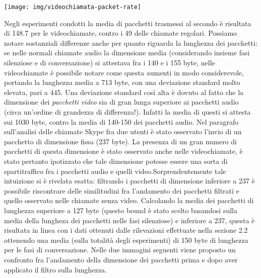 \begin{center}

\begin{minipage}{\linewidth}
\texttt{[image: img/videochiamata-packet-rate]}
\end{minipage}
\end{center}

Negli esperimenti condotti la media di pacchetti trasmessi al secondo è risultata di 148.7 per le videochiamate, contro i 49 delle chiamate regolari.\newline
Possiamo notare sostanziali differenze anche per quanto riguarda la lunghezza dei pacchetti: se nelle normali chiamate audio la dimensione media (considerando insieme fasi silenziose e di conversazione) si attestava fra i 140 e i 155 byte, nelle videochiamate è possibile notare come questa aumenti in modo considerevole, portando la lunghezza media a 713 byte, con una deviazione standard molto elevata, pari a 445.\newline
Una deviazione standard così alta è dovuto al fatto che la dimensione dei \emph{pacchetti video} sia di gran lunga superiore ai pacchetti audio (circa un'ordine di grandezza di differenza!). Infatti la media di questi si attesta sui 1030 byte, contro la media di 140-150 dei pacchetti audio.\newline\newline
Nel paragrafo sull'analisi delle chiamate Skype fra due utenti è stato osservato l'invio di un pacchetto di dimensione fissa (237 byte). La presenza di un gran numero di pacchetti di questa dimensione è stato osservato anche nelle videochiamate, è stato pertanto ipotizzato che tale dimensione potesse essere una sorta di spartitraffico fra i pacchetti audio e quelli video.\newline Sorprendentemente tale intuizione si è rivelata esatta: filtrando i pacchetti di dimensione inferiore a 237 è possibile riscontrare delle similitudini fra l'andamento dei pacchetti filtrati e quello osservato nelle chiamate senza video. Calcolando la media dei pacchetti di lunghezza superiore a 127 byte (questo bound è stato scelto basandosi sulla media della lungheza dei pacchetti nelle fasi silenziose) e inferiore a 237, questa è risultata in linea con i dati ottenuti dalle rilevazioni effettuate nella sezione 2.2 ottenendo una media (sulla totalità degli esperimenti) di 150 byte di lunghezza per le fasi di conversazione. Nelle due immagini seguenti viene proposto un confronto fra l'andamento della dimensione dei pacchetti prima e dopo aver applicato il filtro sulla lunghezza.

